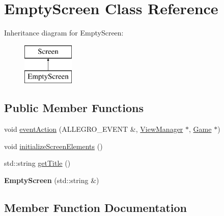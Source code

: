 \hypertarget{classEmptyScreen}{}\section{Empty\+Screen Class Reference}
\label{classEmptyScreen}
Inheritance diagram for Empty\+Screen\+:\begin{figure}[H]
\begin{center}
\leavevmode
\includegraphics[height=2.000000cm]{classEmptyScreen}
\end{center}
\end{figure}
\subsection*{Public Member Functions}
\begin{DoxyCompactItemize}
\item 
void \hyperlink{classEmptyScreen_acb3da5b502cfb7034c4455ad2ddd7510}{event\+Action} (A\+L\+L\+E\+G\+R\+O\+\_\+\+E\+V\+E\+NT \&, \hyperlink{classViewManager}{View\+Manager} $\ast$, \hyperlink{classGame}{Game} $\ast$)
\item 
void \hyperlink{classEmptyScreen_aa2013df5685b5ef8ae87b3d8605da5b6}{initialize\+Screen\+Elements} ()
\item 
std\+::string \hyperlink{classEmptyScreen_ac392a14c00283e4fff6856a3000b4ecd}{get\+Title} ()
\item 
{\bfseries Empty\+Screen} (std\+::string \&)\hypertarget{classEmptyScreen_acdf0c5dab645394c04a7a28beab25acd}{}\label{classEmptyScreen_acdf0c5dab645394c04a7a28beab25acd}

\end{DoxyCompactItemize}


\subsection{Member Function Documentation}
